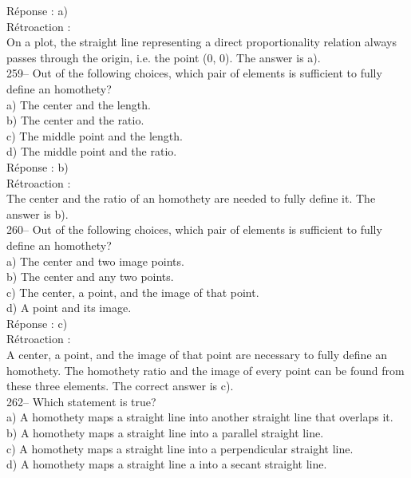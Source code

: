 \documentclass[letterpaper, 12pt]{article}
\begin{document}
R\'eponse : a)\\

R\'etroaction :\\
On a plot, the straight line representing a direct proportionality
relation always passes through the origin, i.e. the point (0, 0).
The answer is a).\\

259-- Out of the following choices, which pair of elements is
sufficient to fully define an homothety?\\

a) The center and the length.\\
b) The center and the ratio.\\
c) The middle point and the length.\\
d) The middle point and the ratio.\\

R\'eponse : b)\\

R\'etroaction :\\
The center and the ratio of an homothety are needed to fully define
it. The answer is b). \\

260-- Out of the following choices, which pair of elements is
sufficient to fully define an homothety?\\

a) The center and two image points.\\
b) The center and any two points.\\
c) The center, a point, and the image of that point.\\
d) A point and its image.\\

R\'eponse : c)\\

R\'etroaction :\\
A center, a point, and the image of that point are necessary to
fully define an homothety. The homothety ratio and the image of
every point can be found from these three elements. The correct answer is c).\\


262-- Which statement is true?\\

a) A homothety maps a straight line into another straight line that overlaps it.\\
b) A homothety maps a straight line into a parallel straight line.\\
c) A homothety maps a straight line into a perpendicular straight
line.\\
d) A homothety maps a straight line a into a secant straight line.\\
\end{document}

